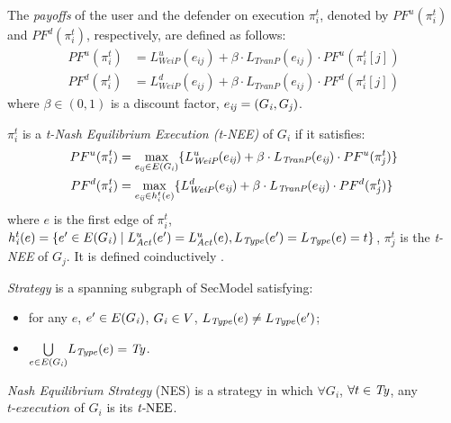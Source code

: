 \documentclass[10pt, conference, compsocconf]{IEEEtran}
\begin{document}
\begin{definition}
The \textit{payoffs} of the user and the defender on execution $\pi_{\textit{i}}^t$, denoted by $PF^u(\pi_{\textit{i}}^t)$ and $PF^d(\pi_{\textit{i}}^t)$, respectively, are defined as follows:
\begin{align*}
PF^u(\pi_{\textit{i}}^t)&=L^u_{\textit{WeiP}}(e_{\textit{ij}}) +\beta\cdot L_{\textit{TranP}}(e_{\textit{ij}})\cdot PF^u(\pi_{\textit{i}}^t[j])\\
PF^d(\pi_{\textit{i}}^t)&=L^d_{\textit{WeiP}}(e_{\textit{ij}}) +\beta\cdot L_{\textit{TranP}}(e_{\textit{ij}})\cdot PF^d(\pi_{\textit{i}}^t[j])
\end{align*}
where $\beta\in(0,1)$ is a discount factor, $e_{\it ij}=(G_{\it i},G_{\it j})$.
\end{definition}

\begin{definition}
$\pi_{\textit{i}}^t$ is a \textit{t-Nash Equilibrium Execution (t-{\rm NEE})} of $G_{\textit{i}}$ if it satisfies:
\begin{align*}
PF^u(\pi_{\textit{i}}^t)&=\underset{e_{\textit{ij}}\in E(G_{\it i}) }{\max}\{L_{\textit{WeiP}}^u({e_{\textit{ij}}})+ \beta\cdot L_{\textit{TranP}}(e_{\textit{ij}})\cdot PF^u(\pi_{\textit{j}}^t)\} \\
PF^d(\pi_{\textit{i}}^t)&=\underset{e_{\textit{ij}}\in h_{\it i}^t(e)}{\max}\{L_{\textit{WeiP}}^d({e_{\textit{ij}}})+ \beta\cdot L_{\textit{TranP}}(e_{\textit{ij}})\cdot PF^d(\pi_{\textit{j}}^t) \}
\end{align*}
where $e$ is the first edge of $\pi_{\textit{i}}^t$,
$h_{\it i}^t(e)=\{e'\in E(G_{\it i})\mid L_{\it Act}^{u}(e')=L_{\it Act}^{u}(e), L_{\it Type}(e')=L_{\it Type}(e)=t\}$,
$\pi_{\textit{j}}^t$ is the \textit{t-{\rm NEE}} of $G_{\textit{j}}$. It is defined coinductively {\rm \cite{davide07}}.
\end{definition}

\begin{definition}
\textit{Strategy} is a spanning subgraph of {\rm SecModel} satisfying:
 \begin{itemize}
 \item for any $e$, $e'\in E(G_{\it i})$, $G_{\it i}\in V$, $L_{\it Type}(e)\neq L_{\it Type}(e')$;
 \item $\underset{e\in E(G_{\it i})}{\bigcup}L_{\it Type}(e)={\it Ty}$.
 \end{itemize}
\end{definition}

\begin{definition}
\textit{Nash Equilibrium Strategy} ({\rm NES}) is a strategy in which $\forall G_{\textit{i}}$, $\forall t\in {\it Ty}$, any $\textit{t-execution}$ of $G_{\textit{i}}$ is its $\textit{t-{\rm NEE}}$.
\end{definition}
\end{document}
